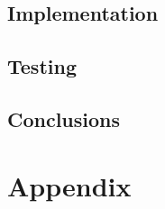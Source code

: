 \documentclass{article}
\begin{document}
\subsection*{Implementation}

\subsection*{Testing}

\subsection*{Conclusions}

\section*{Appendix}
\end{document}
